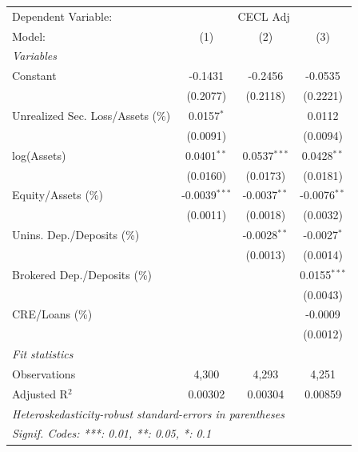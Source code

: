 
\begingroup
\centering
\begin{tabular}{lccc}
   \tabularnewline \midrule \midrule
   Dependent Variable: & \multicolumn{3}{c}{CECL Adj}\\
   Model:                            & (1)             & (2)            & (3)\\  
   \midrule
   \emph{Variables}\\
   Constant                          & -0.1431         & -0.2456        & -0.0535\\   
                                     & (0.2077)        & (0.2118)       & (0.2221)\\   
   Unrealized Sec. Loss/Assets (\%)  & 0.0157$^{*}$    &                & 0.0112\\   
                                     & (0.0091)        &                & (0.0094)\\   
   log(Assets)                       & 0.0401$^{**}$   & 0.0537$^{***}$ & 0.0428$^{**}$\\   
                                     & (0.0160)        & (0.0173)       & (0.0181)\\   
   Equity/Assets (\%)                & -0.0039$^{***}$ & -0.0037$^{**}$ & -0.0076$^{**}$\\   
                                     & (0.0011)        & (0.0018)       & (0.0032)\\   
   Unins. Dep./Deposits (\%)         &                 & -0.0028$^{**}$ & -0.0027$^{*}$\\   
                                     &                 & (0.0013)       & (0.0014)\\   
   Brokered Dep./Deposits (\%)       &                 &                & 0.0155$^{***}$\\   
                                     &                 &                & (0.0043)\\   
   CRE/Loans (\%)                    &                 &                & -0.0009\\   
                                     &                 &                & (0.0012)\\   
   \midrule
   \emph{Fit statistics}\\
   Observations                      & 4,300           & 4,293          & 4,251\\  
   Adjusted R$^2$                    & 0.00302         & 0.00304        & 0.00859\\  
   \midrule \midrule
   \multicolumn{4}{l}{\emph{Heteroskedasticity-robust standard-errors in parentheses}}\\
   \multicolumn{4}{l}{\emph{Signif. Codes: ***: 0.01, **: 0.05, *: 0.1}}\\
\end{tabular}
\par\endgroup


